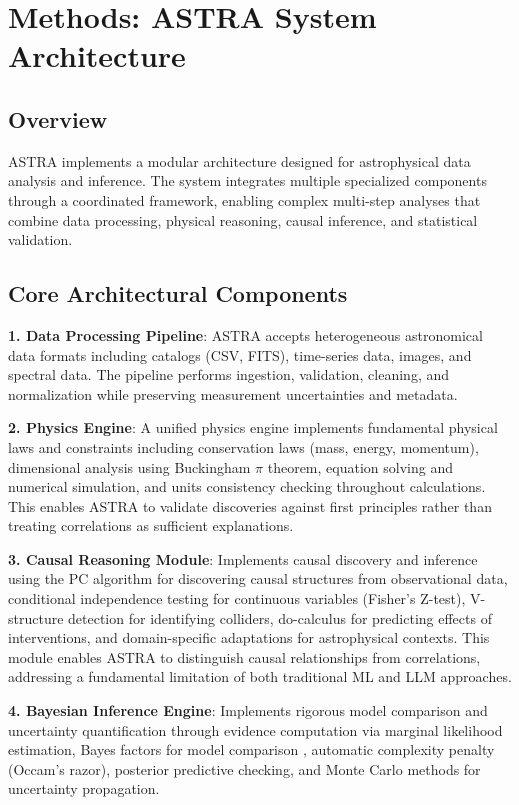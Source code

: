 \documentclass[usenatbib]{rasti}
\begin{document}
\section{Methods: ASTRA System Architecture}

\subsection{Overview}

ASTRA implements a modular architecture designed for astrophysical data analysis and inference. The system integrates multiple specialized components through a coordinated framework, enabling complex multi-step analyses that combine data processing, physical reasoning, causal inference, and statistical validation.

\subsection{Core Architectural Components}

\textbf{1. Data Processing Pipeline}: ASTRA accepts heterogeneous astronomical data formats including catalogs (CSV, FITS), time-series data, images, and spectral data. The pipeline performs ingestion, validation, cleaning, and normalization while preserving measurement uncertainties and metadata.

\textbf{2. Physics Engine}: A unified physics engine implements fundamental physical laws and constraints including conservation laws (mass, energy, momentum), dimensional analysis using Buckingham $\pi$ theorem, equation solving and numerical simulation, and units consistency checking throughout calculations. This enables ASTRA to validate discoveries against first principles rather than treating correlations as sufficient explanations.

\textbf{3. Causal Reasoning Module}: Implements causal discovery and inference using the PC algorithm \citep{spirtes2000} for discovering causal structures from observational data, conditional independence testing for continuous variables (Fisher's Z-test), V-structure detection for identifying colliders, do-calculus for predicting effects of interventions, and domain-specific adaptations for astrophysical contexts. This module enables ASTRA to distinguish causal relationships from correlations, addressing a fundamental limitation of both traditional ML and LLM approaches.

\textbf{4. Bayesian Inference Engine}: Implements rigorous model comparison and uncertainty quantification through evidence computation via marginal likelihood estimation, Bayes factors for model comparison \citep{kass1995}, automatic complexity penalty (Occam's razor), posterior predictive checking, and Monte Carlo methods for uncertainty propagation.
\end{document}
